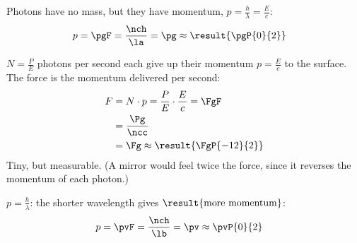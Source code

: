 \begin{abcliste}
\abc Photons have no mass, but they have momentum, $p = \frac{h}{\lambda} = \frac{E}{c}$:
\begin{align}
 p &= \pgF = \frac{\nch}{\la} = \pg \approx \result{\pgP{0}{2}}
\end{align}

\abc $N = \frac{P}{E}$ photons per second each give up their momentum $p = \frac{E}{c}$ to the surface. The force is the momentum delivered per second:
\begin{align}
 F &= N\cdot p = \frac{P}{E}\cdot\frac{E}{c} = \FgF \\
   &= \frac{\Pg}{\ncc} \\
   &= \Fg \approx \result{\FgP{-12}{2}}
\end{align}
Tiny, but measurable. (A mirror would feel twice the force, since it reverses the momentum of each photon.)

\abc $p = \frac{h}{\lambda}$: the shorter wavelength gives $\result{\text{more momentum}}$:
\begin{align}
 p &= \pvF = \frac{\nch}{\lb} = \pv \approx \pvP{0}{2}
\end{align}
\end{abcliste}
